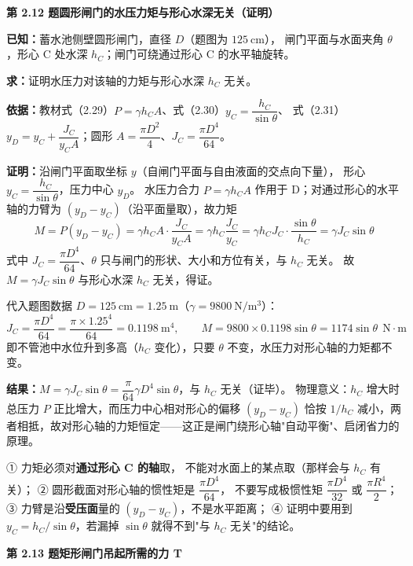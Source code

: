 \noindent\textbf{第 2.12 题\quad 圆形闸门的水压力矩与形心水深无关（证明）}

\begin{jie}
\textbf{已知：}蓄水池侧壁圆形闸门，直径 $D$（题图为 $125\ \mathrm{cm}$），
闸门平面与水面夹角 $\theta$，形心 C 处水深 $h_C$；闸门可绕通过形心 C 的水平轴旋转。

\textbf{求：}证明水压力对该轴的力矩与形心水深 $h_C$ 无关。

\textbf{依据：}教材式（2.29）$P=\gamma h_CA$、式（2.30）$y_C=\dfrac{h_C}{\sin\theta}$、
式（2.31）$y_D=y_C+\dfrac{J_C}{y_CA}$；圆形 $A=\dfrac{\pi D^2}{4}$、$J_C=\dfrac{\pi D^4}{64}$。

\textbf{证明：}沿闸门平面取坐标 $y$（自闸门平面与自由液面的交点向下量），
形心 $y_C=\dfrac{h_C}{\sin\theta}$，压力中心 $y_D$。
水压力合力 $P=\gamma h_CA$ 作用于 D；对通过形心的水平轴的力臂为 $\left(y_D-y_C\right)$（沿平面量取），故力矩
\[ M=P\left(y_D-y_C\right)=\gamma h_CA\cdot\frac{J_C}{y_CA}=\gamma h_C\frac{J_C}{y_C}
=\gamma h_C J_C\cdot\frac{\sin\theta}{h_C}=\gamma J_C\sin\theta \]
式中 $J_C=\dfrac{\pi D^4}{64}$、$\theta$ 只与闸门的形状、大小和方位有关，与 $h_C$ 无关。
故 $M=\gamma J_C\sin\theta$ 与形心水深 $h_C$ 无关，得证。

代入题图数据 $D=125\ \mathrm{cm}=1.25\ \mathrm{m}$（$\gamma=9800\ \mathrm{N/m^3}$）：
\[ J_C=\frac{\pi D^4}{64}=\frac{\pi\times1.25^4}{64}=0.1198\ \mathrm{m^4},\qquad
M=9800\times0.1198\sin\theta=1174\sin\theta\ \ \mathrm{N\cdot m} \]
即不管池中水位升到多高（$h_C$ 变化），只要 $\theta$ 不变，水压力对形心轴的力矩都不变。

\textbf{结果：}$M=\gamma J_C\sin\theta=\dfrac{\pi}{64}\gamma D^4\sin\theta$，与 $h_C$ 无关（证毕）。
物理意义：$h_C$ 增大时总压力 $P$ 正比增大，而压力中心相对形心的偏移 $\left(y_D-y_C\right)$
恰按 $1/h_C$ 减小，两者相抵，故对形心轴的力矩恒定——这正是闸门绕形心轴"自动平衡"、启闭省力的原理。
\end{jie}

\begin{yicuo}
① 力矩必须对\textbf{通过形心 C 的轴}取，
不能对水面上的某点取（那样会与 $h_C$ 有关）；
② 圆形截面对形心轴的惯性矩是 $\dfrac{\pi D^4}{64}$，
不要写成极惯性矩 $\dfrac{\pi D^4}{32}$ 或 $\dfrac{\pi R^4}{2}$；
③ 力臂是沿\textbf{受压面}量的 $\left(y_D-y_C\right)$，不是水平距离；
④ 证明中要用到 $y_C=h_C/\sin\theta$，若漏掉 $\sin\theta$ 就得不到"与 $h_C$ 无关"的结论。
\end{yicuo}

\noindent\textbf{第 2.13 题\quad 矩形闸门吊起所需的力 T}

